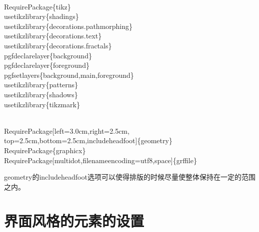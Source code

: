 \documentclass{hnuthesis}%
\begin{document}
\begin{nowebtrunk}
\nwenddocs{}\plusendmoddef\nwstartdeflinemarkup{}\nwenddeflinemarkup
\\RequirePackage\{tikz\}
\\usetikzlibrary\{shadings\}
\\usetikzlibrary\{decorations.pathmorphing\}
\\usetikzlibrary\{decorations.text\}
\\usetikzlibrary\{decorations.fractals\}
\\pgfdeclarelayer\{background\}
\\pgfdeclarelayer\{foreground\}
\\pgfsetlayers\{background,main,foreground\}
\\usetikzlibrary\{patterns\}
\\usetikzlibrary\{shadows\}
\\usetikzlibrary\{tikzmark\}

\\RequirePackage[left=3.0cm,right=2.5cm, top=2.5cm,bottom=2.5cm,includeheadfoot]\{geometry\}
\\RequirePackage\{graphicx\}
\\RequirePackage[multidot,filenameencoding=utf8,space]\{grffile\}

\nwendcode{}\end{nowebtrunk}

geometry的includeheadfoot选项可以使得排版的时候尽量使整体保持在一定的范围之内。

\section{界面风格的元素的设置}
\end{document}
